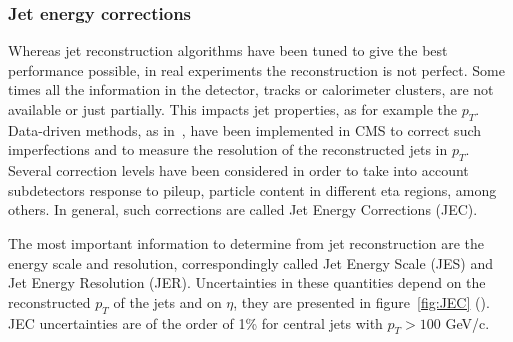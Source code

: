 \subsubsection{Jet energy corrections}
\label{sec:JEC}

Whereas jet reconstruction algorithms have been tuned to give the best performance possible, in real experiments the reconstruction is not perfect. Some times all the information in the detector, tracks or calorimeter clusters, are not available or just partially. This impacts jet properties, as for example the $p_{T}$. Data-driven methods, as in~\cite{2011JInst...611002C}, have been implemented in CMS to correct such imperfections and to measure the resolution of the reconstructed jets in $p_{T}$. Several correction levels have been considered in order to take into account subdetectors response to pileup, particle content in different eta regions, among others. In general, such corrections are called Jet Energy Corrections (JEC). 

The most important information to determine from jet reconstruction are the energy scale and resolution, correspondingly called Jet Energy Scale (JES) and Jet Energy Resolution (JER). Uncertainties in these quantities depend on the reconstructed $p_{T}$ of the jets and on $\eta$, they are presented in figure~\ref{fig:JEC} (\cite{Brochet:1956723}). JEC uncertainties are of the order of 1\% for central jets with $p_{T}>100$ GeV/c.

